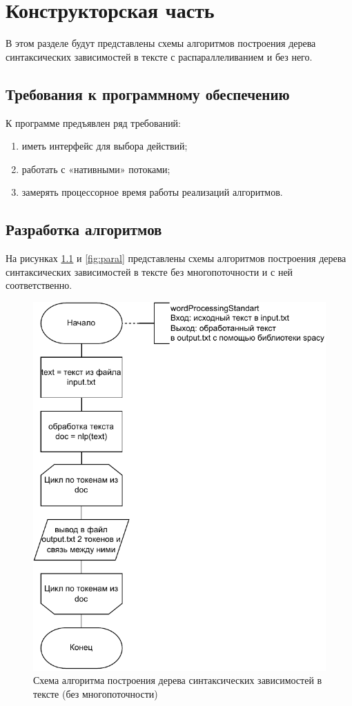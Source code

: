 \chapter{Конструкторская часть}
В этом разделе будут представлены схемы алгоритмов построения дерева синтаксических зависимостей в тексте с распараллеливанием и без него.

\section{Требования к программному обеспечению}

К программе предъявлен ряд требований:
\begin{enumerate}[label=\arabic*)]
	\item иметь интерфейс для выбора действий;
	\item работать с «нативными» потоками;
	\item замерять процессорное время работы реализаций алгоритмов.
\end{enumerate}

\section{Разработка алгоритмов}

На рисунках \ref{fig:noparal} и \ref{fig:paral} представлены схемы алгоритмов построения дерева синтаксических зависимостей в тексте без многопоточности и с ней соответственно.

\begin{figure}[h!]
	\centering
	\includegraphics[width=0.5\linewidth]{img/no_paral}
	\caption{Схема алгоритма построения дерева синтаксических зависимостей в тексте (без многопоточности)}
	\label{fig:noparal}
\end{figure}

